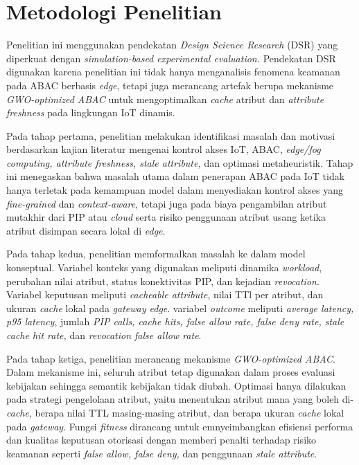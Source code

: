 \section{Metodologi Penelitian}

Penelitian ini menggunakan pendekatan \textit{Design Science Research} (DSR) yang diperkuat dengan \textit{simulation-based experimental evaluation.} Pendekatan DSR digunakan karena penelitian ini tidak hanya menganalisis fenomena keamanan pada ABAC berbasis \textit{edge}, tetapi juga merancang artefak berupa mekanisme \textit{GWO-optimized ABAC} untuk mengoptimalkan \textit{cache} atribut dan \textit{attribute freshness} pada lingkungan IoT dinamis.

Pada tahap pertama, penelitian melakukan identifikasi masalah dan motivasi berdasarkan kajian literatur mengenai kontrol akses IoT, ABAC, \textit{edge/fog computing, attribute freshness, stale attribute,} dan optimasi metaheuristik. Tahap ini menegaskan bahwa masalah utama dalam penerapan ABAC pada IoT tidak hanya terletak pada kemampuan model dalam menyediakan kontrol akses yang \textit{fine-grained} dan \textit{context-aware}, tetapi juga pada biaya pengambilan atribut mutakhir dari PIP atau \textit{cloud} serta risiko penggunaan atribut usang ketika atribut disimpan secara lokal di \textit{edge}.

Pada tahap kedua, penelitian memformalkan masalah ke dalam model konseptual. Variabel konteks yang digunakan meliputi dinamika \textit{workload}, perubahan nilai atribut, status konektivitas PIP, dan kejadian \textit{revocation}. Variabel keputusan meliputi \textit{cacheable attribute}, nilai TTl per atribut, dan ukuran \textit{cache} lokal pada \textit{gateway edge}. variabel \textit{outcome} meliputi \textit{average latency, p95 latency}, jumlah \textit{PIP calls, cache hits, false allow rate, false deny rate, stale cache hit rate,} dan \textit{revocation false allow rate}.

Pada tahap ketiga, penelitian merancang mekanisme \textit{GWO-optimized ABAC}. Dalam mekanisme ini, seluruh atribut tetap digunakan dalam proses evaluasi kebijakan sehingga semantik kebijakan tidak diubah. Optimasi hanya dilakukan pada strategi pengelolaan atribut, yaitu menentukan atribut mana yang boleh di-\textit{cache}, berapa nilai TTL masing-masing atribut, dan berapa ukuran \textit{cache} lokal pada \textit{gateway}. Fungsi \textit{fitness} dirancang untuk emnyeimbangkan efisiensi performa dan kualitas keputusan otorisasi dengan memberi penalti terhadap risiko keamanan seperti \textit{false allow, false deny,} dan penggunaan \textit{stale attribute}.

